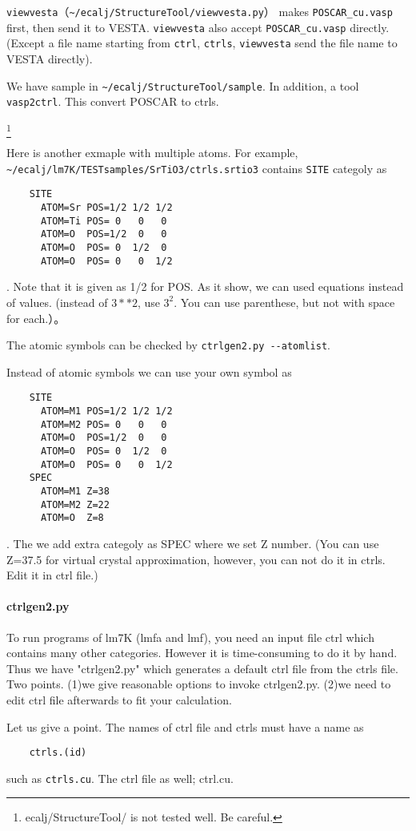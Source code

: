 \documentclass[a4paper,10pt,epsf,fleqn]{article}
\begin{document}
\verb+viewvesta+（\verb+~/ecalj/StructureTool/viewvesta.py+）
makes \verb+POSCAR_cu.vasp+ first, then send it to VESTA.
\verb+viewvesta+ also accept \verb+POSCAR_cu.vasp+ directly.
(Except a file name starting from \verb+ctrl+, \verb+ctrls+,
\verb+viewvesta+ send the file name to VESTA directly).

We have sample in \verb+~/ecalj/StructureTool/sample+.
In addition, a tool \verb+vasp2ctrl+.
This convert POSCAR to ctrls.

\footnote{ ecalj/StructureTool/ is not tested well. Be careful.}

Here is another exmaple with multiple atoms. For example,
\verb+~/ecalj/lm7K/TESTsamples/SrTiO3/ctrls.srtio3+ contains
\verb+SITE+ categoly as
\begin{verbatim}
    SITE
      ATOM=Sr POS=1/2 1/2 1/2
      ATOM=Ti POS= 0   0   0
      ATOM=O  POS=1/2  0   0
      ATOM=O  POS= 0  1/2  0
      ATOM=O  POS= 0   0  1/2
\end{verbatim}
. Note that it is given as 1/2 for POS.
As it show, we can used equations instead of values.
(instead of $3**2$, use $3^2$. You can use parenthese, but not with space
for each.）。

The atomic symbols can be checked by \verb+ctrlgen2.py --atomlist+.

Instead of atomic symbols we can use your own symbol as
\begin{verbatim}
    SITE
      ATOM=M1 POS=1/2 1/2 1/2
      ATOM=M2 POS= 0   0   0
      ATOM=O  POS=1/2  0   0
      ATOM=O  POS= 0  1/2  0
      ATOM=O  POS= 0   0  1/2
    SPEC
      ATOM=M1 Z=38
      ATOM=M2 Z=22
      ATOM=O  Z=8
\end{verbatim}
. The we add extra categoly as SPEC where we set Z number.
(You can use Z=37.5 for virtual crystal approximation, however, 
you can not do it in ctrls. Edit it in ctrl file.)


\paragraph{ctrlgen2.py}
To run programs of lm7K (lmfa and lmf),
you need an input file ctrl which contains many other categories.
However it is time-consuming to do it by hand.
Thus we have "ctrlgen2.py" which generates a default ctrl file from
the ctrls file. Two points. (1)we give reasonable options to invoke
ctrlgen2.py. (2)we need to edit ctrl file afterwards to fit your calculation.

Let us give a point. The names of ctrl file and ctrls must have a name as
\begin{verbatim}
    ctrls.(id)
\end{verbatim}
such as \verb+ctrls.cu+. The ctrl file as well; ctrl.cu.
\end{document}
